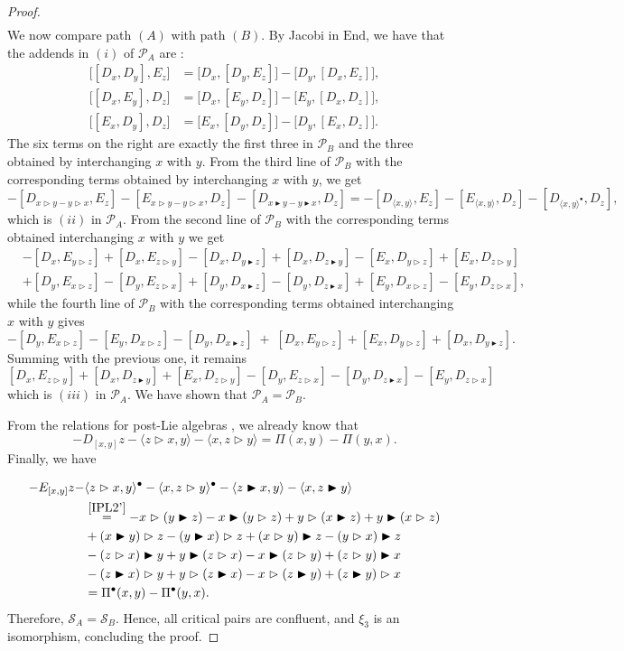 \documentclass[10pt]{article}
\theoremstyle{definition}
\newcommand{\wt}{\vartriangleright}
\newcommand{\bt}{\blacktriangleright}
\newcommand{\ab}[2]{\langle #1,#2\rangle}
\newcommand{\abd}[2]{\langle #1,#2\rangle^{\bullet}}
\begin{document}
\begin{proof}
\begin{align*}
\end{align*}
We now compare path $(A)$ with path $(B)$. By Jacobi in $\mathrm{End}$, we have that the addends in $(i)$ of $\mathcal{P}_{A}$ are :
\begin{align*}
\bigl[[D_x,D_y],E_z\bigr] &= \bigl[D_x,[D_y,E_z]\bigr]-\bigl[D_y,[D_x,E_z]\bigr],\\
\bigl[[D_x,E_y],D_z\bigr] &= \bigl[D_x,[E_y,D_z]\bigr]-\bigl[E_y,[D_x,D_z]\bigr],\\
\bigl[[E_x,D_y],D_z\bigr] &= \bigl[E_x,[D_y,D_z]\bigr]-\bigl[D_y,[E_x,D_z]\bigr].
\end{align*}
The six terms on the right are exactly the first three in $\mathcal{P}_{B}$ and the three obtained by interchanging $x$ with $y$. From the third line of $\mathcal{P}_{B}$ with the corresponding terms obtained by interchanging $x$ with $y$, we get
\[
-[D_{x\wt y-y\wt x},E_z]-[E_{x\wt y-y\wt x},D_z]-[D_{x\bt y-y\bt x},D_z]=-[D_{\ab{x}{y}},E_z]-[E_{\ab{x}{y}},D_z]-[D_{\abd{x}{y}},D_z],
\]
which is $(ii)$ in $\mathcal{P}_{A}$. From the second line of $\mathcal{P}_{B}$ with the corresponding terms obtained interchanging $x$ with $y$ we get
\begin{align*}
&-[D_x,E_{y\wt z}]+[D_x,E_{z\wt y}]-[D_x,D_{y\bt z}]+[D_x,D_{z\bt y}]-[E_x,D_{y\wt z}]+[E_x,D_{z\wt y}]\\&+[D_y,E_{x\wt z}]-[D_y,E_{z\wt x}]+[D_y,D_{x\bt z}]-[D_y,D_{z\bt x}]+[E_y,D_{x\wt z}]-[E_y,D_{z\wt x}],
\end{align*}
while the fourth line of $\mathcal{P}_{B}$ with the corresponding terms obtained interchanging $x$ with $y$ gives
\[
-[D_y,E_{x\wt z}]-[E_y,D_{x\wt z}]-[D_y,D_{x\bt z}]\;+\;[D_x,E_{y\wt z}]+[E_x,D_{y\wt z}]+[D_x,D_{y\bt z}] .
\]
Summing with the previous one, it remains
\[
[D_x,E_{z\wt y}]+[D_x,D_{z\bt y}]+[E_x,D_{z\wt y}]-[D_y,E_{z\wt x}]-[D_y,D_{z\bt x}]-[E_y,D_{z\wt x}]
\]
which is $(iii)$ in $\mathcal{P}_{A}$. We have shown that $\mathcal{P}_{A}=\mathcal{P}_{B}$.

From the relations for post-Lie algebras \cite[Theorem 6.1]{DG}, we already know that 
\[
-D_{[x,y]}z-\ab{z\wt x}{y}-\ab{x}{z\wt y}=\Pi(x,y)-\Pi(y,x).
\]
Finally, we have

\begin{align*}
-E_{[x,y]}z-&\abd{z\wt x}{y}-\abd{x}{z\wt y}-\ab{z\bt x}{y}-\ab{x}{z\bt y}\\
&\overset{\eqref{IPL2'}}{=}-x\wt(y\bt z)-x\bt(y\wt z)+y\wt(x\bt z)+y\bt(x\wt z)\\
&+(x\bt y)\wt z-(y\bt x)\wt z+(x\wt y)\bt z-(y\wt x)\bt z\\
&-(z\wt x)\bt y+y\bt(z\wt x)-x\bt(z\wt y)+(z\wt y)\bt x\\
&-(z\bt x)\wt y+y\wt(z\bt x)-x\wt(z\bt y)+(z\bt y)\wt x\\&=\Pi^{\bullet}(x,y)-\Pi^{\bullet}(y,x).
\end{align*}
Therefore, $\mathcal{S}_{A}=\mathcal{S}_{B}$. Hence, all critical pairs are confluent, and $\xi_3$ is an isomorphism, concluding the proof. 
\end{proof}
\end{document}
